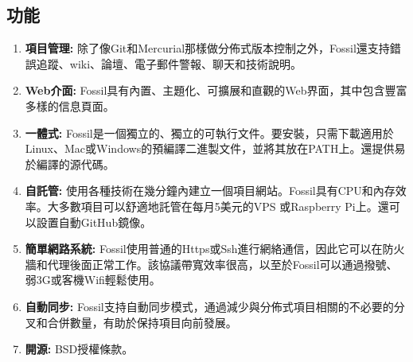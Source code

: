 \subsection{功能}
\par
\renewcommand{\baselinestretch}{1} %
\begin{enumerate}
	\item \textbf{項目管理:} 除了像Git和Mercurial那樣做分佈式版本控制之外，Fossil還支持錯誤追蹤、wiki、論壇、電子郵件警報、聊天和技術說明。
	\item \textbf{Web介面:} Fossil具有內置、主題化、可擴展和直觀的Web界面，其中包含豐富多樣的信息頁面。
	\item \textbf{一體式:} Fossil是一個獨立的、獨立的可執行文件。要安裝，只需下載適用於Linux、Mac或Windows的預編譯二進製文件，並將其放在PATH上。還提供易於編譯的源代碼。
	\item \textbf{自託管:} 使用各種技術在幾分鐘內建立一個項目網站。Fossil具有CPU和內存效率。大多數項目可以舒適地託管在每月5美元的VPS 或Raspberry Pi上。還可以設置自動GitHub鏡像。
	\item \textbf{簡單網路系統:} Fossil使用普通的Https或Ssh進行網絡通信，因此它可以在防火牆和代理後面正常工作。該協議帶寬效率很高，以至於Fossil可以通過撥號、弱3G或客機Wifi輕鬆使用。
	\item \textbf{自動同步:} Fossil支持自動同步模式，通過減少與分佈式項目相​​關的不必要的分叉和合併數量，有助於保持項目向前發展。
	\item \textbf{開源:} BSD授權條款。
\end{enumerate}
\par

\renewcommand{\baselinestretch}{20} %
